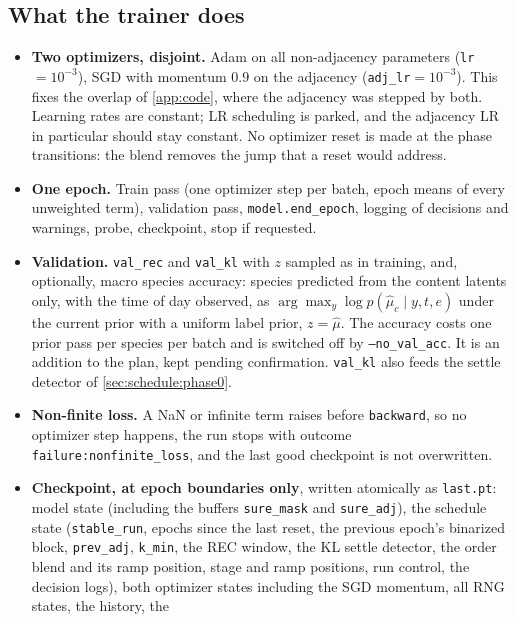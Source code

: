\subsection{What the trainer does}
\label{sec:schedule:trainer}
\begin{itemize}[leftmargin=1.5em]
\item \textbf{Two optimizers, disjoint.} Adam on all non-adjacency parameters
      (\texttt{lr}$=10^{-3}$), SGD with momentum $0.9$ on the adjacency
      (\texttt{adj\_lr}$=10^{-3}$). This fixes the overlap of \cref{app:code}, where
      the adjacency was stepped by both. Learning rates are constant; LR scheduling
      is parked, and the adjacency LR in particular should stay constant. No optimizer
      reset is made at the phase transitions: the blend removes the jump that a reset
      would address.
\item \textbf{One epoch.} Train pass (one optimizer step per batch, epoch means of
      every unweighted term), validation pass, \texttt{model.end\_epoch}, logging of
      decisions and warnings, probe, checkpoint, stop if requested.
\item \textbf{Validation.} \texttt{val\_rec} and \texttt{val\_kl} with $z$ sampled as
      in training, and, optionally, macro species accuracy: species predicted from the
      content latents only, with the time of day observed, as
      $\arg\max_y\log p(\hat\mu_c\mid y,t,e)$ under the current prior with a uniform
      label prior, $z=\hat\mu$. The accuracy costs one prior pass per species per
      batch and is switched off by \texttt{--no\_val\_acc}. It is an addition to the
      plan, kept pending confirmation. \texttt{val\_kl} also feeds the settle detector
      of \cref{sec:schedule:phase0}.
\item \textbf{Non-finite loss.} A NaN or infinite term raises before \texttt{backward},
      so no optimizer step happens, the run stops with outcome
      \texttt{failure:nonfinite\_loss}, and the last good checkpoint is not
      overwritten.
\item \textbf{Checkpoint, at epoch boundaries only}, written atomically as
      \texttt{last.pt}: model state (including the buffers \texttt{sure\_mask} and
      \texttt{sure\_adj}), the schedule state (\texttt{stable\_run}, epochs since the
      last reset, the previous epoch's binarized block, \texttt{prev\_adj},
      \texttt{k\_min}, the REC window, the KL settle detector, the order blend and its
      ramp position, stage and ramp positions, run control, the decision logs), both
      optimizer states including the SGD momentum, all RNG states, the history, the

\end{itemize}

